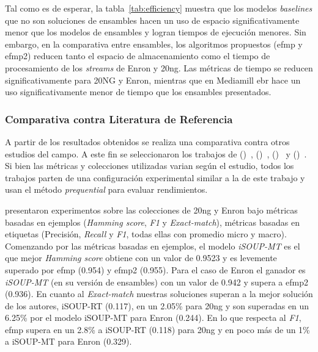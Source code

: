 Tal como es de esperar, la tabla~\ref{tab:efficiency} muestra que los modelos
\textit{baselines} que no son soluciones de ensambles hacen un uso de espacio
significativamente menor que los modelos de ensambles y logran tiempos de
ejecución menores. Sin embargo, en la comparativa entre ensambles, los
algoritmos propuestos (\acrshort{efmp} y \acrshort{efmp2}) reducen tanto el
espacio de almacenamiento como el tiempo de procesamiento de los
\textit{streams} de Enron y 20ng. Las métricas de tiempo se reducen
significativamente para 20NG y Enron, mientras que en Mediamill \acrshort{ebr}
hace un uso significativamente menor de tiempo que los ensambles presentados.

\subsubsection{Comparativa contra Literatura de Referencia}

A partir de los resultados obtenidos se realiza una comparativa contra otros
estudios del campo. A este fin se seleccionaron los trabajos de
\citeauthor{osojnik_multi-label_2017}
(\citeyear{osojnik_multi-label_2017})~\cite{osojnik_multi-label_2017},
\citeauthor{roseberry_multi-label_2018}
(\citeyear{roseberry_multi-label_2018})~\cite{roseberry_multi-label_2018},
\citeauthor{buyukcakir_novel_2018}
(\citeyear{buyukcakir_novel_2018})~\cite{buyukcakir_novel_2018} y
\citeauthor{sousa_multi-label_2018}
(\citeyear{sousa_multi-label_2018})~\cite{sousa_multi-label_2018}. Si bien las
métricas y colecciones utilizadas varian según el estudio, todos los trabajos
parten de una configuración experimental similar a la de este trabajo y usan el
método \textit{prequential} para evaluar rendimientos.

\citeauthor{osojnik_multi-label_2017} presentaron experimentos sobre las
colecciones de 20ng y Enron bajo métricas basadas en ejemplos (\textit{Hamming
	score}, \textit{F1} y \textit{Exact-match}), métricas basadas en etiquetas
(Precisión, \textit{Recall} y \textit{F1}, todas ellas con promedio micro y
macro). Comenzando por las métricas basadas en ejemplos, el modelo
\textit{iSOUP-MT} es el que mejor \textit{Hamming score} obtiene con un valor de
0.9523 y es levemente superado por \acrshort{efmp} (0.954) y \acrshort{efmp2}
(0.955). Para el caso de Enron el ganador es \textit{iSOUP-MT} (en su versión de
ensambles) con un valor de 0.942 y supera a \acrshort{efmp2} (0.936). En cuanto
al \textit{Exact-match} nuestras soluciones superan a la mejor solución de los
autores, iSOUP-RT (0.117), en un 2.05\% para 20ng y son superadas en un 6.25\%
por el modelo iSOUP-MT para Enron (0.244). En lo que respecta al \textit{F1},
\acrshort{efmp} supera en un 2.8\% a iSOUP-RT (0.118) para 20ng y en poco más de
un 1\% a iSOUP-MT para Enron (0.329).

